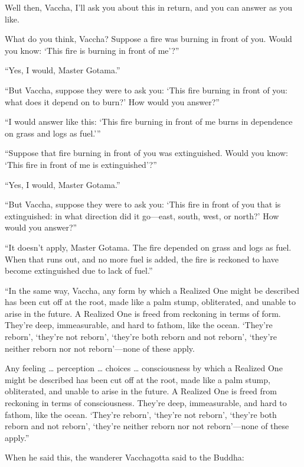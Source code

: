 \documentclass[12pt,openany]{book}%
\begin{document}
Well then, Vaccha, I’ll ask you about this in return, and you can answer as you like. 

What do you think, Vaccha? Suppose a fire was burning in front of you. Would you know: ‘This fire is burning in front of me’?” 

“Yes, I would, Master Gotama.” 

“But Vaccha, suppose they were to ask you: ‘This fire burning in front of you: what does it depend on to burn?’ How would you answer?” 

“I would answer like this: ‘This fire burning in front of me burns in dependence on grass and logs as fuel.’” 

“Suppose that fire burning in front of you was extinguished. Would you know: ‘This fire in front of me is extinguished’?” 

“Yes, I would, Master Gotama.” 

“But Vaccha, suppose they were to ask you: ‘This fire in front of you that is extinguished: in what direction did it go—east, south, west, or north?’ How would you answer?” 

“It doesn’t apply, Master Gotama. The fire depended on grass and logs as fuel. When that runs out, and no more fuel is added, the fire is reckoned to have become extinguished due to lack of fuel.” 

“In the same way, Vaccha, any form by which a Realized One might be described has been cut off at the root, made like a palm stump, obliterated, and unable to arise in the future. A Realized One is freed from reckoning in terms of form. They’re deep, immeasurable, and hard to fathom, like the ocean. ‘They’re reborn’, ‘they’re not reborn’, ‘they’re both reborn and not reborn’, ‘they’re neither reborn nor not reborn’—none of these apply. 

Any feeling … perception … choices … consciousness by which a Realized One might be described has been cut off at the root, made like a palm stump, obliterated, and unable to arise in the future. A Realized One is freed from reckoning in terms of consciousness. They’re deep, immeasurable, and hard to fathom, like the ocean. ‘They’re reborn’, ‘they’re not reborn’, ‘they’re both reborn and not reborn’, ‘they’re neither reborn nor not reborn’—none of these apply.” 

When he said this, the wanderer Vacchagotta said to the Buddha: 
\end{document}
